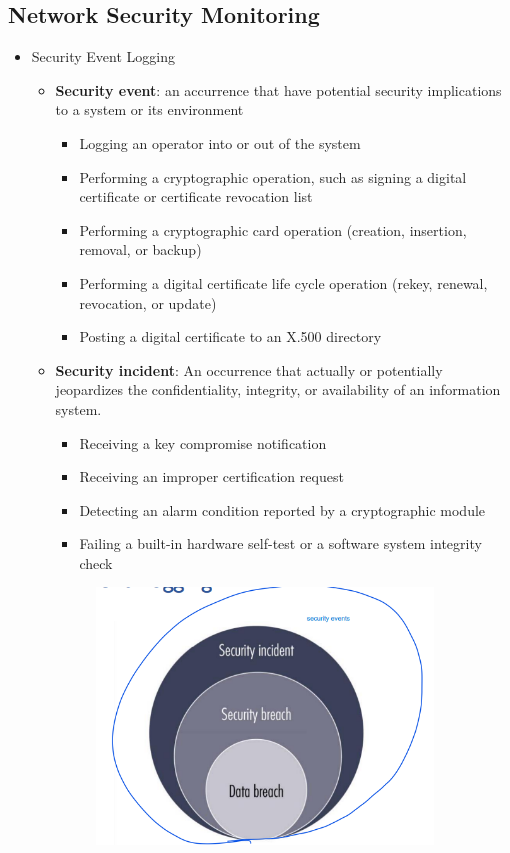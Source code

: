 \documentclass{article}
\begin{document}
\subsection{Network Security Monitoring}
\begin{itemize}
    \item Security Event Logging
    \begin{itemize}
        \item \textbf{Security event}: an accurrence that have potential security implications to a system or its environment
        \begin{itemize}
            \item Logging an operator into or out of the system
            \item Performing a cryptographic operation, such as signing a digital certificate or certificate revocation list
            \item Performing a cryptographic card operation (creation, insertion, removal, or backup)
            \item Performing a digital certificate life cycle operation (rekey, renewal, revocation, or update)
            \item Posting a digital certificate to an X.500 directory
        \end{itemize}
        \item \textbf{Security incident}: An occurrence that actually or potentially jeopardizes the confidentiality, integrity, or availability of an information system.
        \begin{itemize}
            \item Receiving a key compromise notification
            \item Receiving an improper certification request
            \item Detecting an alarm condition reported by a cryptographic module
            \item Failing a built-in hardware self-test or a software system integrity check
        \end{itemize}
        \begin{figure}[h]
            \centering
            \includegraphics[width=0.90\textwidth]{figure/security_event_logging.png}

\end{figure}
\end{itemize}
\end{itemize}
\end{document}
